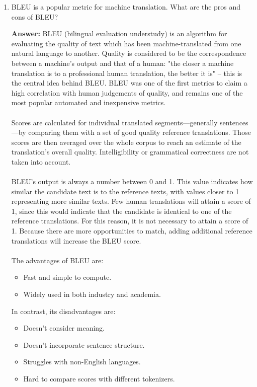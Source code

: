 \documentclass{article}
\newenvironment{QandA}{\begin{enumerate}[label=\arabic*.]}{\end{enumerate}}
\newenvironment{answer}{\par\normalfont \textbf{Answer:}}{}
\begin{document}
\begin{QandA}
    \item BLEU is a popular metric for machine translation. What are the pros and cons of BLEU?
    \begin{answer}
        BLEU (bilingual evaluation understudy) is an algorithm for evaluating the quality of text which has been machine-translated from one natural language to another. Quality is considered to be the correspondence between a machine's output and that of a human: "the closer a machine translation is to a professional human translation, the better it is" – this is the central idea behind BLEU. BLEU was one of the first metrics to claim a high correlation with human judgements of quality, and remains one of the most popular automated and inexpensive metrics.\\\\
        Scores are calculated for individual translated segments—generally sentences—by comparing them with a set of good quality reference translations. Those scores are then averaged over the whole corpus to reach an estimate of the translation's overall quality. Intelligibility or grammatical correctness are not taken into account.\\\\
        BLEU's output is always a number between 0 and 1. This value indicates how similar the candidate text is to the reference texts, with values closer to 1 representing more similar texts. Few human translations will attain a score of 1, since this would indicate that the candidate is identical to one of the reference translations. For this reason, it is not necessary to attain a score of 1. Because there are more opportunities to match, adding additional reference translations will increase the BLEU score.\\\\
        The advantages of BLEU are:
        \begin{itemize}
            \item Fast and simple to compute. 
            \item Widely used in both industry and academia.
        \end{itemize}
        In contrast, its disadvantages are:
        \begin{itemize}
            \item Doesn't consider meaning.
            \item Doesn't incorporate sentence structure.
            \item Struggles with non-English languages.
            \item Hard to compare scores with different tokenizers.
        \end{itemize}


\end{answer}
\end{QandA}
\end{document}
